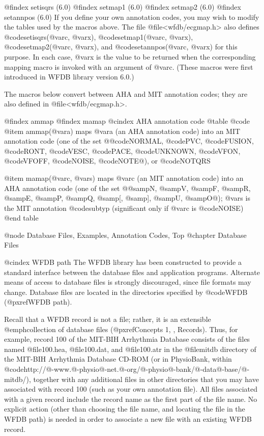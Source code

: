 {{{{{{{{{{@findex setisqrs (6.0)
@findex setmap1 (6.0)
@findex setmap2 (6.0)
@findex setannpos (6.0)
If you define your own annotation codes, you may wish to modify the
tables used by the macros above.  The file @file{<wfdb/ecgmap.h>} also defines
@code{setisqrs(@var{c}, @var{x})}, @code{setmap1(@var{c}, @var{x})},
@code{setmap2(@var{c}, @var{x})}, and @code{setannpos(@var{c}, @var{x})}
for this purpose.  In each case, @var{x} is the value to be returned
when the corresponding mapping macro is invoked with an argument of
@var{c}.  (These macros were first introduced in WFDB library version
6.0.)

The macros below convert between AHA and MIT annotation codes;  they are
also defined in @file{<wfdb/ecgmap.h>}.

@findex ammap
@findex mamap
@cindex AHA annotation code
@table @code
@item ammap(@var{a})
maps @var{a} (an AHA annotation code) into an MIT annotation code
(one of the set @{@code{NORMAL}, @code{PVC}, @code{FUSION}, @code{RONT},
@code{VESC}, @code{PACE}, @code{UNKNOWN}, @code{VFON}, @code{VFOFF},
@code{NOISE}, @code{NOTE}@}), or @code{NOTQRS}

@item mamap(@var{c}, @var{s})
maps @var{c} (an MIT annotation code) into an AHA annotation code
(one of the set @{@samp{N}, @samp{V}, @samp{F}, @samp{R}, @samp{E},
@samp{P}, @samp{Q}, @samp{[}, @samp{]}, @samp{U}, @samp{O}@}); @var{s}
is the MIT annotation @code{subtyp} (significant only if @var{c} is
@code{NOISE})
@end table

@node     Database Files, Examples, Annotation Codes, Top
@chapter Database Files

@cindex WFDB path
The WFDB library has been constructed to provide a standard interface
between the database files and application programs.  Alternate means of
access to database files is strongly discouraged, since file formats may
change.  Database files are located in the directories specified by
@code{WFDB} (@pxref{WFDB path}).

Recall that a WFDB record is not a file; rather, it is an extensible
@emph{collection} of database files (@pxref{Concepts 1, , Records}).  Thus, for
example, record 100 of the MIT-BIH Arrhythmia Database consists of the files
named @file{100.hea}, @file{100.dat}, and @file{100.atr} in the @file{mitdb}
directory of the MIT-BIH Arrhythmia Database CD-ROM (or in PhysioBank, within
@code{http://@-www.@-physio@-net.@-org/@-physio@-bank/@-data@-base/@-mitdb/}),
together with any additional files in other directories that you may have
associated with record 100 (such as your own annotation file).  All files
associated with a given record include the record name as the first part of the
file name.  No explicit action (other than choosing the file name, and locating
the file in the WFDB path) is needed in order to associate a new file with an
existing WFDB record.

}}}}}}}}}}
